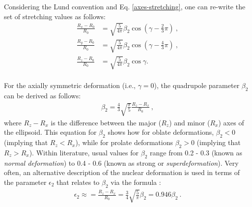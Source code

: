 Considering the Lund convention and Eq. \eqref{axes-stretching}, one can re-write the set of stretching values as follows:
\begin{align}
    \frac{R_x-R_0}{R_0}&=\sqrt{\frac{5}{4\pi}}\beta_2\cos\left(\gamma-\frac{2}{3}\pi\right)\ , \\
    \frac{R_y-R_0}{R_0}&=\sqrt{\frac{5}{4\pi}}\beta_2\cos\left(\gamma-\frac{4}{3}\pi\right)\ , \\
    \frac{R_z-R_0}{R_0}&=\sqrt{\frac{5}{4\pi}}\beta_2\cos\gamma. \\
\end{align}

For the axially symmetric deformation (i.e., $\gamma=0$), the quadrupole parameter $\beta_2$ can be derived as follows:
\begin{align}
    \beta_2=\frac{4}{3}\sqrt{\frac{\pi}{5}}\frac{R_z-R_x}{R_0}\ ,
\end{align}
where $R_z-R_x$ is the difference between the major ($R_z$) and minor ($R_x$) axes of the ellipsoid. This equation for $\beta_2$ shows how for oblate deformations, $\beta_2<0$ (implying that $R_z<R_x$), while for prolate deformations $\beta_2>0$ (implying that $R_z>R_x$). Within literature, usual values for $\beta_2$ range from 0.2 - 0.3 (known as \emph{normal deformation}) to 0.4 - 0.6 (known as strong or \emph{superdeformation}). Very often, an alternative description of the nuclear deformation is used in terms of the parameter $\epsilon_2$ that relates to $\beta_2$ via the formula \cite{casten2000nuclear}:
\begin{align}
    \epsilon_2\approx=\frac{R_z-R_x}{R_0}=\frac{3}{4}\sqrt{\frac{5}{\pi}}\beta_2=0.946\beta_2\ .
    \label{epsilon-beta-relation}
\end{align}



